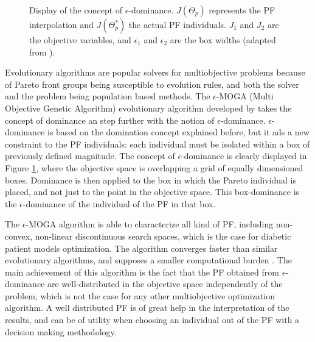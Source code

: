 \begin{figure}[hbt]
\centering
{}\caption{Display of the concept of $\epsilon$-dominance. $J(\Theta_p)$ represents the PF interpolation and $J(\Theta_p^*)$ the actual PF individuals. $J_1$ and $J_2$ are the objective variables, and $\epsilon_1$ and $\epsilon_2$ are the box widths (adapted from \cite{herrero2007well}).}
\label{fig:eps_dominance}
\end{figure}

Evolutionary algorithms are popular solvers for multiobjective problems because of Pareto front groups being susceptible to evolution rules, and both the solver and the problem being population based methods. The $\epsilon$-MOGA (Multi Objective Genetic Algorithm) evolutionary algorithm developed by \cite{herrero2007well} takes the concept of dominance an step further with the notion of $\epsilon$-dominance. $\epsilon$-dominance is based on the domination concept explained before, but it ads a new constraint to the PF individuals: each individual must be isolated within a box of previously defined magnitude. The concept of $\epsilon$-dominance is clearly displayed in Figure \ref{fig:eps_dominance}, where the objective space is overlapping a grid of equally dimensioned boxes. Dominance is then applied to the box in which the Pareto individual is placed, and not just to the point in the objective space. This box-dominance is the $\epsilon$-dominance of the individual of the PF in that box.

The $\epsilon$-MOGA algorithm is able to characterize all kind of PF, including non-convex, non-linear discontinuous search spaces, which is the case for diabetic patient models optimization. The algorithm converges faster than similar evolutionary algorithms, and supposes a smaller computational burden \cite{juanmatesis}. The main achievement of this algorithm is the fact that the PF obtained from $\epsilon$-dominance are well-distributed in the objective space independently of the problem, which is not the case for any other multiobjective optimization algorithm. A well distributed PF is of great help in the interpretation of the results, and can be of utility when choosing an individual out of the PF with a decision making methodology.



